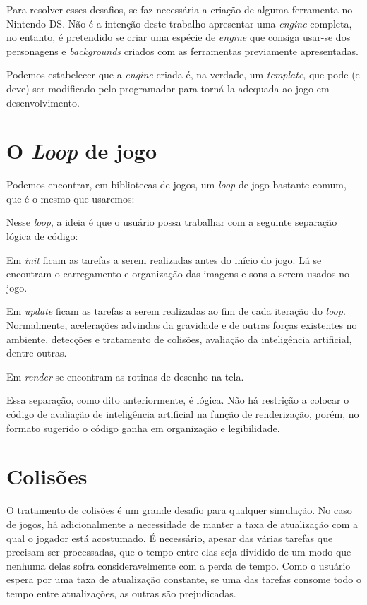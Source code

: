 \documentclass[brazil]{abnt}
\begin{document}
Para resolver esses desafios, se faz necessária a criação de alguma ferramenta no Nintendo DS. Não é a intenção deste trabalho apresentar uma \textit{engine} completa, no entanto, é pretendido se criar uma espécie de \textit{engine} que consiga usar-se dos personagens e \textit{backgrounds} criados com as ferramentas previamente apresentadas.

Podemos estabelecer que a \textit{engine} criada é, na verdade, um \textit{template}, que pode (e deve) ser modificado pelo programador para torná-la adequada ao jogo em desenvolvimento.

\section{O \textit{Loop} de jogo}

Podemos encontrar, em bibliotecas de jogos, um \textit{loop} de jogo bastante comum, que é o mesmo que usaremos:



Nesse \textit{loop}, a ideia é que o usuário possa trabalhar com a seguinte separação lógica de código:

Em \textit{init} ficam as tarefas a serem realizadas antes do início do jogo. Lá se encontram o carregamento e organização das imagens e sons a serem usados no jogo.

Em \textit{update} ficam as tarefas a serem realizadas ao fim de cada iteração do \textit{loop}. Normalmente, acelerações advindas da gravidade e de outras forças existentes no ambiente, detecções e tratamento de colisões, avaliação da inteligência artificial, dentre outras.

Em \textit{render} se encontram as rotinas de desenho na tela.

Essa separação, como dito anteriormente, é lógica. Não há restrição a colocar o código de avaliação de inteligência artificial na função de renderização, porém, no formato sugerido o código ganha em organização e legibilidade.

\section{Colisões}

O tratamento de colisões é um grande desafio para qualquer simulação. No caso de jogos, há adicionalmente a necessidade de manter a taxa de atualização com a qual o jogador está acostumado. É necessário, apesar das várias tarefas que precisam ser processadas, que o tempo entre elas seja dividido de um modo que nenhuma delas sofra consideravelmente com a perda de tempo. Como o usuário espera por uma taxa de atualização constante, se uma das tarefas consome todo o tempo entre atualizações, as outras são prejudicadas.
\end{document}

